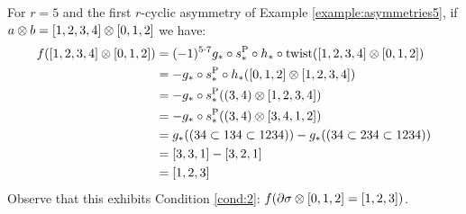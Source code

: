 \begin{example}\label{example:f5_2}
	For $r=5$ and the first $r$-cyclic asymmetry of Example \ref{example:asymmetries5}, if $a \otimes b = [1,2,3,4] \otimes [0,1,2]$ we have:
	\begin{align*}
		f([1,2,3,4] \otimes [0,1,2])
		&= (-1)^{5\cdot 7}g_*\circ s_*^{\operatorname{P}}\circ h_*\circ \operatorname{twist}([1,2,3,4] \otimes [0,1,2])
		\\
		&= -g_*\circ s_*^{\operatorname{P}}\circ h_*([0,1,2] \otimes [1,2,3,4])
		\\
		&= -g_*\circ s_*^{\operatorname{P}}((3,4) \otimes [1,2,3,4])
		\\
		&= -g_*\circ s_*^{\operatorname{P}}((3,4) \otimes [3,4,1,2])
		\\
		&= g_*((34 \subset 134 \subset 1234)) - g_*((34 \subset 234 \subset 1234))
		\\
		&= [3,3,1] - [3,2,1]
		\\
		&= [1,2,3]
	\end{align*}
	Observe that this exhibits Condition \eqref{cond:2}: $f(\partial\sigma \otimes [0,1,2] = [1,2,3])$.
\end{example}

